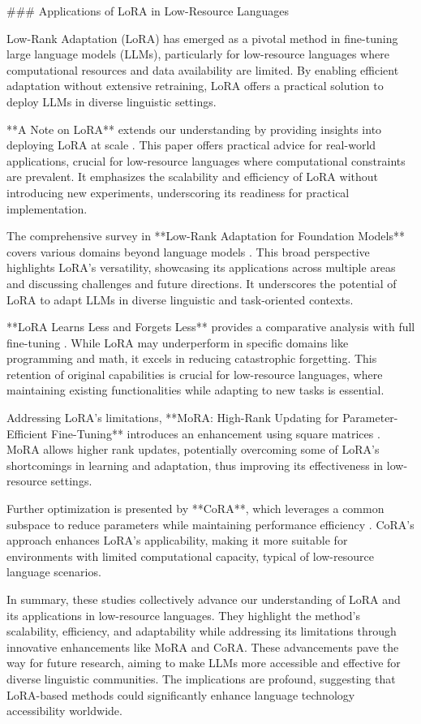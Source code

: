\documentclass[conference]{IEEEtran}
\begin{document}
### Applications of LoRA in Low-Resource Languages

Low-Rank Adaptation (LoRA) has emerged as a pivotal method in fine-tuning large language models (LLMs), particularly for low-resource languages where computational resources and data availability are limited. By enabling efficient adaptation without extensive retraining, LoRA offers a practical solution to deploy LLMs in diverse linguistic settings.

**A Note on LoRA** extends our understanding by providing insights into deploying LoRA at scale \cite{b1}. This paper offers practical advice for real-world applications, crucial for low-resource languages where computational constraints are prevalent. It emphasizes the scalability and efficiency of LoRA without introducing new experiments, underscoring its readiness for practical implementation.

The comprehensive survey in **Low-Rank Adaptation for Foundation Models** covers various domains beyond language models \cite{b2}. This broad perspective highlights LoRA's versatility, showcasing its applications across multiple areas and discussing challenges and future directions. It underscores the potential of LoRA to adapt LLMs in diverse linguistic and task-oriented contexts.

**LoRA Learns Less and Forgets Less** provides a comparative analysis with full fine-tuning \cite{b3}. While LoRA may underperform in specific domains like programming and math, it excels in reducing catastrophic forgetting. This retention of original capabilities is crucial for low-resource languages, where maintaining existing functionalities while adapting to new tasks is essential.

Addressing LoRA's limitations, **MoRA: High-Rank Updating for Parameter-Efficient Fine-Tuning** introduces an enhancement using square matrices \cite{b4}. MoRA allows higher rank updates, potentially overcoming some of LoRA's shortcomings in learning and adaptation, thus improving its effectiveness in low-resource settings.

Further optimization is presented by **CoRA**, which leverages a common subspace to reduce parameters while maintaining performance efficiency \cite{b5}. CoRA's approach enhances LoRA's applicability, making it more suitable for environments with limited computational capacity, typical of low-resource language scenarios.

In summary, these studies collectively advance our understanding of LoRA and its applications in low-resource languages. They highlight the method's scalability, efficiency, and adaptability while addressing its limitations through innovative enhancements like MoRA and CoRA. These advancements pave the way for future research, aiming to make LLMs more accessible and effective for diverse linguistic communities. The implications are profound, suggesting that LoRA-based methods could significantly enhance language technology accessibility worldwide.
\end{document}
